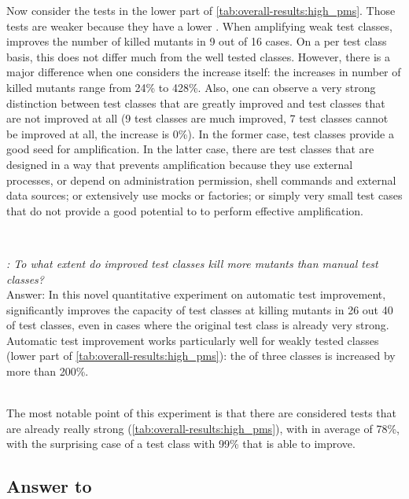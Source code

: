 Now consider the tests in the lower part of \autoref{tab:overall-results:high_pms}. %
Those tests are weaker because they have a lower \ms. 
When amplifying  weak test classes, \dspot improves the number of killed mutants in 9 out of 16 cases. 
On a per test class basis, this does not differ much from the well tested classes. 
However, there is a major difference when one considers the increase itself: the increases in number of killed mutants range from 24\% to 428\%. 
Also, one can observe a very strong distinction between test classes that are greatly improved and test classes that are not improved at all (9 test classes are much improved, 7 test classes cannot be improved at all, the increase is 0\%). 
In the former case, test classes provide a good seed for amplification. 
In the latter case, there are test classes that are designed in a way that prevents amplification because they use external processes, or depend on administration permission, shell commands and external data sources; or extensively use mocks or factories; or simply very small test cases that do not provide a good potential to \dspot to perform effective amplification.

~\\
\begin{mdframed}
	\textit{\rqeffectiveness: To what extent do improved  test classes kill more mutants than manual test classes?}\\
	Answer: In this novel quantitative experiment on automatic test improvement, \dspot significantly improves the capacity of test classes at killing mutants in 26 out 40 of test classes, even in cases where the original test class is already very strong. 
	Automatic test improvement works particularly well for weakly tested classes (lower part of \autoref{tab:overall-results:high_pms}): the \ms of three classes is increased by more than 200\%.
\end{mdframed}
~\\
The most notable point of this experiment is that there are considered tests that are already really strong (\autoref{tab:overall-results:high_pms}), with \ms in average of 78\%, with the surprising case of a test class with 99\% \ms that \dspot is able to improve. 


\subsection{Answer to \rqAmplVersusIAmpl}
\label{subsec:test-improvement:experiment-results:rq4}

